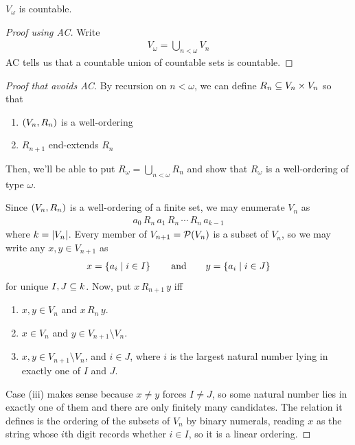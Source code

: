 \begin{boxproposition}
    $V_{\omega}$ is countable.
\end{boxproposition}
\begin{proof}[Proof using AC]
    Write
    \begin{align*}
        V_{\omega} = \bigcup_{n < \omega} V_n
    \end{align*}
    AC tells us that a countable union of countable sets is countable.
\end{proof}
\begin{proof}[Proof that avoids AC]
    By recursion on $n < \omega$, we can define $R_n \subseteq V_n \times V_n$ so that
    \begin{enumerate}[label = (\arabic*)]
        \item $\left( V_n, R_n \right)$ is a well-ordering
        \item $R_{n+1}$ end-extends $R_n$
    \end{enumerate}
    Then, we'll be able to put $R_{\omega} = \bigcup_{n < \omega} R_n$ and show that $R_{\omega}$ is a well-ordering of type $\omega$.

    Since $\left( V_n, R_n \right)$ is a well-ordering of a finite set, we may enumerate $V_n$ as
    \begin{align*}
        a_0 \, R_n \, a_1 \, R_n \, \cdots \, R_n \, a_{k-1}
    \end{align*}
    where $k = \left\lvert V_n \right\rvert$. Every member of $V_{n+1} = \mathcal{P}\!\left( V_n \right)$ is a subset of $V_n$, so we may write any $x, y \in V_{n+1}$ as
    \begin{align*}
        x = \left\{ a_i \; \middle\vert \; i \in I \right\}
        \qquad \text{and} \qquad
        y = \left\{ a_i \; \middle\vert \; i \in J \right\}
    \end{align*}
    for unique $I, J \subseteq k$. Now, put $x \, R_{n+1} \, y$ iff
    \begin{enumerate}[label = (\roman*)]
        \item $x, y \in V_n$ and $x \, R_n \, y$.
        \item $x \in V_n$ and $y \in V_{n + 1} \setminus V_n$.
        \item $x, y \in V_{n+1} \setminus V_n$, and $i \in J$, where $i$ is the largest natural number lying in exactly one of $I$ and $J$.
    \end{enumerate}
    Case (iii) makes sense because $x \neq y$ forces $I \neq J$, so some natural number lies in exactly one of them and there are only finitely many candidates. The relation it defines is the ordering of the subsets of $V_n$ by binary numerals, reading $x$ as the string whose $i$th digit records whether $i \in I$, so it is a linear ordering.


\end{proof}
